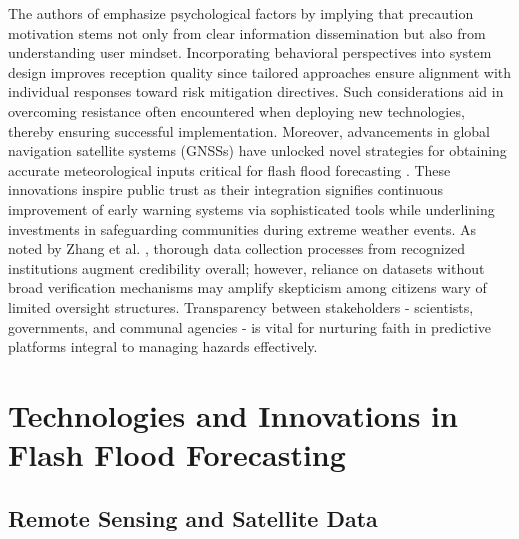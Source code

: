 The authors of \citep{Laudan2020} emphasize psychological factors by implying that precaution motivation stems not only from clear information dissemination but also from understanding user mindset. Incorporating behavioral perspectives into system design improves reception quality since tailored approaches ensure alignment with individual responses toward risk mitigation directives. Such considerations aid in overcoming resistance often encountered when deploying new technologies, thereby ensuring successful implementation.
Moreover, advancements in global navigation satellite systems (GNSSs) have unlocked novel strategies for obtaining accurate meteorological inputs critical for flash flood forecasting \citep{Zanchetta2020}. These innovations inspire public trust as their integration signifies continuous improvement of early warning systems via sophisticated tools while underlining investments in safeguarding communities during extreme weather events.
As noted by Zhang et al. \citep{Zhang2022}, thorough data collection processes from recognized institutions augment credibility overall; however, reliance on datasets without broad verification mechanisms may amplify skepticism among citizens wary of limited oversight structures. Transparency between stakeholders - scientists, governments, and communal agencies - is vital for nurturing faith in predictive platforms integral to managing hazards effectively.


\section{Technologies and Innovations in Flash Flood Forecasting}

\subsection{Remote Sensing and Satellite Data}

